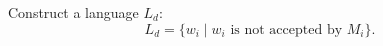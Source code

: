 

\setcounter{section}{8}
\setcounter{subsection}{5}
\setcounter{dfn}{8}


Construct a language $L_d$:
\[
L_d = \{w_i \mid w_i \text{ is not accepted by }M_i\}.
\]


